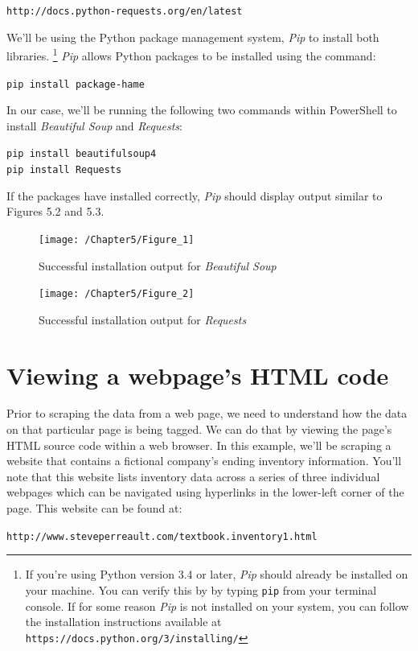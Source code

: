 \documentclass{book}
\begin{document}
	\texttt{http://docs.python-requests.org/en/latest}
	
	We'll be using the Python package management system, \textit{Pip} to install both libraries. \footnote{If you're using Python version 3.4 or later, \textit{Pip} should already be installed on your machine. You can verify this by by typing \texttt{pip} from your terminal console. If for some reason \textit{Pip} is not installed on your system, you can follow the installation instructions available at \texttt{https://docs.python.org/3/installing/}} \textit{Pip} allows Python packages to be installed using the command:
	
	\texttt{pip install package-hame}
	
	In our case, we'll be running the following two commands within PowerShell to install \textit{Beautiful Soup} and \textit{Requests}:
	
	\texttt{pip install beautifulsoup4} \\
	\texttt{pip install Requests}
	
	If the packages have installed correctly, \textit{Pip} should display output similar to Figures 5.2 and 5.3.
	
\begin{figure}[h]
	\caption{Successful installation output for \textit{Beautiful Soup}}
	\centering\texttt{[image: /Chapter5/Figure\_1]}
\end{figure}

\begin{figure}[h]
	\caption{Successful installation output for \textit{Requests}}
	\centering\texttt{[image: /Chapter5/Figure\_2]}
\end{figure}

\section{Viewing a webpage's HTML code}
	Prior to scraping the data from a web page, we need to understand how the data on that particular page is being tagged. We can do that by viewing the page's HTML source code within a web browser. In this example, we'll be scraping a website that contains a fictional company's ending inventory information. You'll note that this website lists inventory data across a series of three individual webpages which can be navigated using hyperlinks in the lower-left corner of the page. This website can be found at:
	
	\texttt{http://www.steveperreault.com/textbook.inventory1.html}
	
\end{document}
